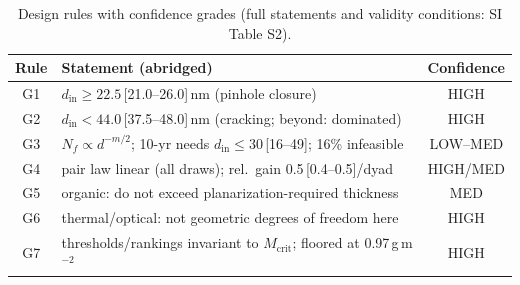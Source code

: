 \documentclass[11pt]{article}
\newcommand{\din}{d_{\mathrm{in}}}
\begin{document}
\begin{table}[p]\centering\caption{Design rules with confidence grades (full statements and validity conditions: SI Table S2).}\label{tab:rules}
\begin{tabular}{clc}\toprule
Rule & Statement (abridged) & Confidence \\\midrule
G1 & $\din\ge22.5$\,[21.0--26.0]\,nm (pinhole closure) & HIGH \\
G2 & $\din<44.0$\,[37.5--48.0]\,nm (cracking; beyond: dominated) & HIGH \\
G3 & $N_f\propto d^{-m/2}$; 10-yr needs $\din\le30$\,[16--49]; 16\% infeasible & LOW--MED \\
G4 & pair law linear (all draws); rel.\ gain 0.5\,[0.4--0.5]/dyad & HIGH/MED \\
G5 & organic: do not exceed planarization-required thickness & MED \\
G6 & thermal/optical: not geometric degrees of freedom here & HIGH \\
G7 & thresholds/rankings invariant to $M_{\mathrm{crit}}$; floored at 0.97\,g\,m$^{-2}$ & HIGH \\\bottomrule
\end{tabular}\end{table}
\end{document}
